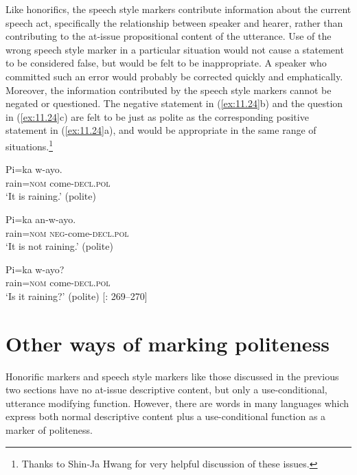 Like  honorifics, the  speech style markers contribute information about the current speech act, specifically the relationship between speaker and hearer, rather than contributing to the at-issue propositional content of the utterance. Use of the wrong speech style marker in a particular situation would not cause a statement to be considered false, but would be felt to be inappropriate. A speaker who committed such an error would probably be corrected quickly and emphatically. Moreover, the information contributed by the speech style markers cannot be negated or questioned. The negative statement in (\ref{ex:11.24}b) and the question in (\ref{ex:11.24}c) are felt to be just as polite as the corresponding positive statement in (\ref{ex:11.24}a), and would be appropriate in the same range of situations.\footnote{Thanks to Shin-Ja Hwang for very helpful discussion of these issues.}


\ea \label{ex:11.24} 
\ea  \gll Pi=ka  w-ayo.\\
rain=\textsc{nom}  come-\textsc{decl.pol}\\
\glt ‘It is raining.’ (polite)

\ex \gll Pi=ka  an-w-ayo.\\
rain=\textsc{nom}  \textsc{neg}-come-\textsc{decl.pol}\\
\glt ‘It is not raining.’ (polite)

\ex \gll  Pi=ka  w-ayo?\\
rain=\textsc{nom}  come-\textsc{decl.pol}\\
\glt ‘Is it raining?’ (polite)  [\citealt{Sohn1999}: 269–270]
\z
\z

\section{Other ways of marking politeness}\label{sec:11.5}

Honorific markers and speech style markers like those discussed in the previous two sections have no at-issue descriptive content, but only a use-conditional, utterance modifying function. However, there are words in many languages which express both normal descriptive content plus a use-conditional function as a marker of politeness.



